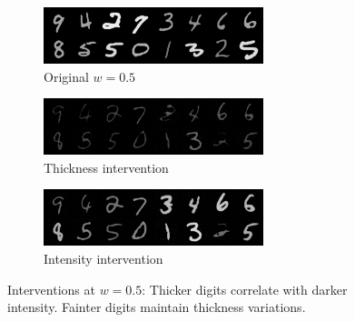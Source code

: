 \documentclass{article}
\begin{document}
	\begin{figure}[H]
		\centering
		\begin{subfigure}{0.32\textwidth}
			\centering
			\includegraphics[width=\textwidth]{images/original_0.5}
			\caption{Original $w=0.5$}
		\end{subfigure}
		\begin{subfigure}{0.32\textwidth}
			\centering
			\includegraphics[width=\textwidth]{images/thickness_0.5}
			\caption{Thickness intervention}
		\end{subfigure}
		\begin{subfigure}{0.32\textwidth}
			\centering
			\includegraphics[width=\textwidth]{images/intensity_0.5}
			\caption{Intensity intervention}
		\end{subfigure}
		\caption{Interventions at $w=0.5$: Thicker digits correlate with darker intensity. Fainter digits maintain thickness variations.}
		\label{fig:w05}
	\end{figure}
	
\end{document}
